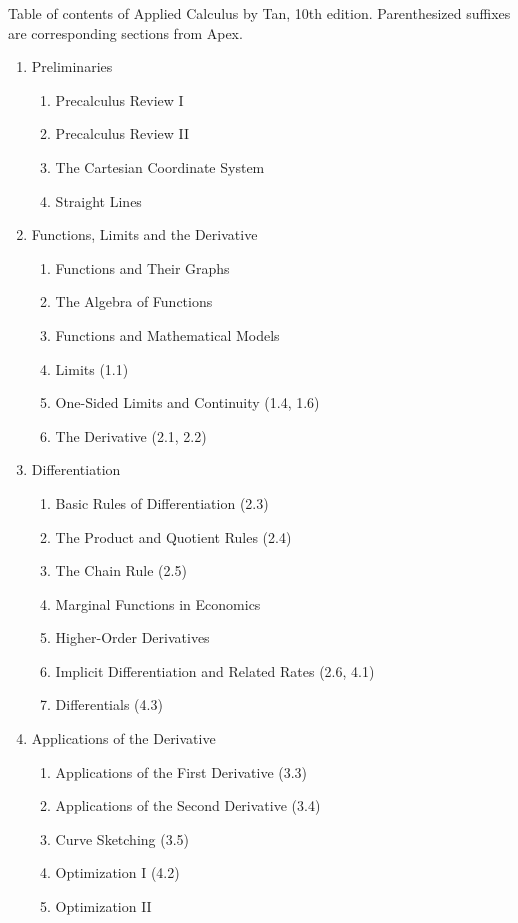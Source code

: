 \documentclass{article}
\begin{document}
Table of contents of Applied Calculus by Tan, 10th edition.  Parenthesized suffixes are corresponding sections from Apex.

\begin{enumerate}
\item Preliminaries
    \begin{enumerate}
    \item Precalculus Review I
    \item Precalculus Review II
    \item The Cartesian Coordinate System
    \item Straight Lines
    \end{enumerate}
\item Functions, Limits and the Derivative
    \begin{enumerate}
    \item Functions and Their Graphs
    \item The Algebra of Functions
    \item Functions and Mathematical Models
    \item Limits (1.1)
    \item One-Sided Limits and Continuity (1.4, 1.6)
    \item The Derivative (2.1, 2.2)
    \end{enumerate}
\item Differentiation
	\begin{enumerate}
	\item Basic Rules of Differentiation (2.3)
	\item The Product and Quotient Rules (2.4)
	\item The Chain Rule (2.5)
	\item Marginal Functions in Economics
	\item Higher-Order Derivatives
	\item Implicit Differentiation and Related Rates (2.6, 4.1)
	\item Differentials (4.3)
	\end{enumerate}
\item Applications of the Derivative
	\begin{enumerate}
	\item Applications of the First Derivative (3.3)
	\item Applications of the Second Derivative (3.4)
	\item Curve Sketching (3.5)
	\item Optimization I (4.2)
	\item Optimization II

\end{enumerate}
\end{enumerate}
\end{document}
